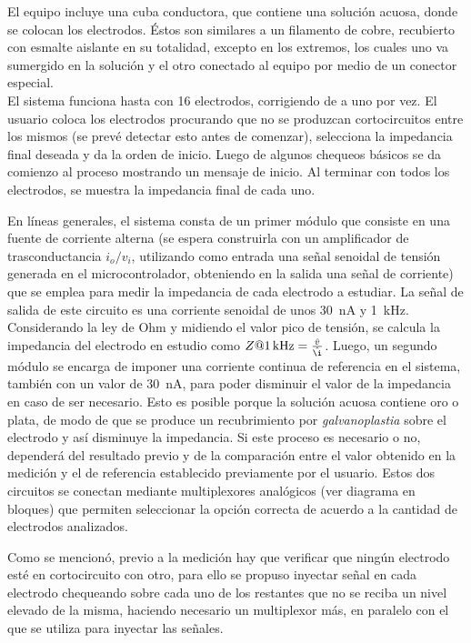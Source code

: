 El equipo incluye una cuba conductora, que contiene una solución acuosa, donde se colocan los electrodos. Éstos son similares a un filamento de cobre, recubierto con esmalte aislante en su totalidad, excepto en los extremos, los cuales uno va sumergido en la solución y el otro conectado al equipo por medio de un conector especial.\\
El sistema funciona hasta con 16 electrodos, corrigiendo de a uno por vez. El usuario coloca los electrodos procurando que no se produzcan cortocircuitos entre los mismos (se prevé detectar esto antes de comenzar), selecciona la impedancia final deseada y da la orden de inicio. Luego de algunos chequeos básicos se da comienzo al proceso mostrando un mensaje de inicio. Al terminar con todos los electrodos, se muestra la impedancia final de cada uno. 

En líneas generales, el sistema consta de un primer módulo que consiste en una fuente de corriente alterna (se espera construirla con un amplificador de trasconductancia $i_o/v_i$, utilizando como entrada una señal senoidal de tensión generada en el microcontrolador, obteniendo en la salida una señal de corriente) que se emplea para medir la impedancia de cada electrodo a estudiar. La señal de salida de este circuito es una corriente senoidal de unos \SI{30}{\nano\ampere} y \SI{1}{\kilo\hertz}. Considerando la ley de Ohm y midiendo el valor pico de tensión, se calcula la impedancia del electrodo en estudio como $Z@\SI{1}{\kilo\hertz} = \frac{\hat{v}}{\hat{\i}}$. Luego, un segundo módulo se encarga de imponer una corriente continua de referencia en el sistema, también con un valor de \SI{30}{\nano\ampere}, para poder disminuir el valor de la impedancia en caso de ser necesario. Esto es posible porque la solución acuosa contiene oro o plata, de modo de que se produce un recubrimiento por \emph{galvanoplastia} sobre el electrodo y así disminuye la impedancia. Si este proceso es necesario o no, dependerá del resultado previo y de la comparación entre el valor obtenido en la medición y el de referencia establecido previamente por el usuario. Estos dos circuitos se conectan mediante multiplexores analógicos (ver diagrama en bloques) que permiten seleccionar la opción correcta de acuerdo a la cantidad de electrodos analizados. 

Como se mencionó, previo a la medición hay que verificar que ningún electrodo esté en cortocircuito con otro, para ello se propuso inyectar señal en cada electrodo chequeando sobre cada uno de los restantes que no se reciba un nivel elevado de la misma, haciendo necesario un multiplexor más, en paralelo con el que se utiliza para inyectar las señales.

